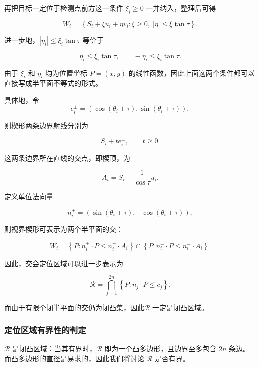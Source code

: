 \documentclass[withoutpreface,bwprint]{cumcmthesis} %
\begin{document}
再把目标一定位于检测点前方这一条件 $\xi_i\geq0$ 一并纳入，整理后可得

\begin{equation}
W_i= \left\{ S_i+\xi u_i+\eta v_i: \xi\geq0,\; |\eta|\leq\xi\tan\tau \right\}.
\end{equation}

进一步地，$|\eta_i|\leq\xi_i\tan\tau$ 等价于

\[
\eta_i\leq\xi_i\tan\tau, \qquad -\eta_i\leq\xi_i\tan\tau.
\]

由于 $\xi_i$ 和 $\eta_i$ 均为位置坐标 $P=(x,y)$ 的线性函数，因此上面这两个条件都可以直接写成半平面不等式的形式。

具体地，令
\begin{equation}
e_i^\pm= \left( \cos(\theta_i\pm\tau), \sin(\theta_i\pm\tau) \right),
\end{equation}

则楔形两条边界射线分别为

\[
S_i+t e_i^\pm,\qquad t\geq0.
\]

这两条边界所在直线的交点，即楔顶，为

\begin{equation}
A_i = S_i+\frac{1}{\cos\tau}u_i.
\end{equation}

定义单位法向量

\[
n_i^\pm = \left( \sin(\theta_i\mp\tau), -\cos(\theta_i\mp\tau) \right),
\]

则视界楔形可表示为两个半平面的交：

\begin{equation}
W_i= \left\{ P:n_i^+\cdot P\leq n_i^+\cdot A_i \right\} \cap \left\{ P:n_i^-\cdot P\leq n_i^-\cdot A_i \right\}.
\end{equation}

因此，交会定位区域可以进一步表示为

\begin{equation}
\mathcal R = \bigcap_{j=1}^{2n} \left\{ P:n_j\cdot P\leq c_j \right\}.
\end{equation}

而由于有限个闭半平面的交仍为闭凸集，因此$\mathcal R$ 一定是闭凸区域。

\subsubsection{定位区域有界性的判定}

 $\mathcal R$ 是闭凸区域：当其有界时，$\mathcal R$ 即为一个凸多边形，且边界至多包含 $2n$ 条边。
 而凸多边形的直径是易求的，因此我们将讨论 $\mathcal R$ 是否有界。
\end{document}
